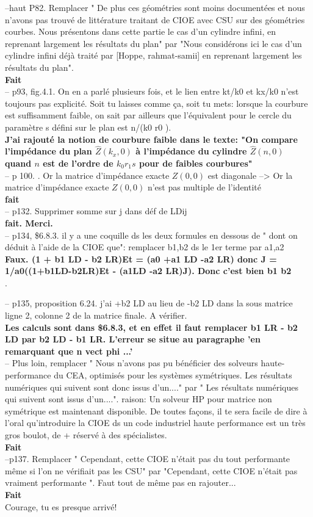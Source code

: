 \documentclass{article}
\newcommand{\rep}[1]{\\\textbf{\color{green!50!black}#1}\\}
\newcommand{\que}[1]{\\\textbf{\color{red!50!black}#1}\\}
\begin{document}
--haut P82. Remplacer " De plus ces géométries sont moins documentées et nous n’avons pas trouvé de littérature traitant de CIOE avec CSU sur des géométries courbes. Nous présentons dans cette partie le cas d’un cylindre infini, en reprenant largement
les résultats du plan" par "Nous considérons ici le cas d’un cylindre infini déjà traité par [Hoppe, rahmat-samii] en reprenant largement les résultats du plan".
\rep{Fait}

-- p93, fig.4.1. On en a parlé plusieurs fois, et le lien entre kt/k0 et kx/k0 n'est toujours pas explicité. Soit tu laisses comme ça, soit tu mets: lorsque la courbure est suffisamment faible, on sait par ailleurs que l'équivalent pour le cercle du  paramètre s défini sur le plan est n/(k0 r0 ).
\rep{J'ai rajouté la notion de courbure faible dans le texte: "On compare l'impédance du plan \(\hat{Z}(k_x,0)\) à l'impédance du cylindre \(\hat{Z}(n,0)\) quand \(n\) est de l'ordre de \(k_0r_1s\) pour de faibles courbures"}

-- p 100. . Or la matrice d’impédance exacte \(Z(0, 0)\) est diagonale --> Or la matrice d’impédance exacte \(Z(0, 0)\) n'est pas multiple de l'identité
\rep{fait}

-- p132. Supprimer somme sur j dans déf de LDij
\rep{fait. Merci.}

-- p134, \$6.8.3. il y a une coquille ds les deux formules en dessous de " dont on déduit à l’aide de la CIOE que": remplacer b1,b2 ds le 1er terme par a1,a2
\que{Faux. (1 + b1 LD - b2 LR)Et = (a0 +a1 LD -a2 LR) donc J = 1/a0((1+b1LD-b2LR)Et - (a1LD -a2 LR)J). Donc c'est bien b1 b2}.

-- p135, proposition 6.24. j'ai +b2 LD au lieu de -b2 LD dans la sous matrice ligne 2, colonne 2 de la matrice finale. A vérifier.
\rep{Les calculs sont dans \$6.8.3, et en effet il faut remplacer b1 LR - b2 LD par b2 LD - b1 LR. L'erreur se situe au paragraphe 'en remarquant que n vect phi ...'}

-- Plus loin, remplacer  " Nous n’avons pas pu bénéficier des solveurs haute-performance du CEA, optimisés pour les systèmes symétriques. Les résultats numériques qui suivent sont donc issus d’un...." par " Les résultats numériques qui suivent sont issus d’un....".
      raison: Un solveur HP pour matrice non symétrique est maintenant disponible. De toutes façons, il te sera facile de dire à l'oral qu'introduire la CIOE ds un code industriel haute performance est un très gros boulot, de + réservé à des spécialistes.
\rep{Fait}

--p137.  Remplacer " Cependant, cette CIOE n’était pas du tout performante même si l’on ne vérifiait pas les CSU" par "Cependant, cette CIOE n’était pas vraiment performante ". Faut tout de même pas en rajouter...
\rep{Fait}

Courage, tu es presque arrivé!



 
\end{document}
